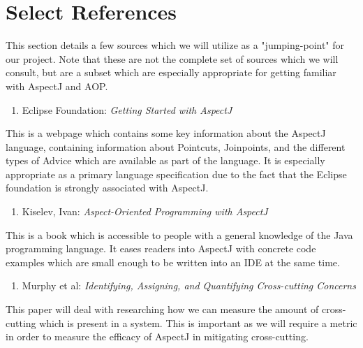 \documentclass[sigconf]{acmart}
\begin{document}
\section{Select References}

This section details a few sources which we will utilize as a "jumping-point" for our project. Note that these are not the complete set of sources which we will consult, but are a subset which are especially appropriate for getting familiar with AspectJ and AOP.

\begin{enumerate}
    \item Eclipse Foundation: \textit{Getting Started with AspectJ}
\end{enumerate}
This is a webpage which contains some key information about the AspectJ language, containing information about Pointcuts, Joinpoints, and the different types of Advice which are available as part of the language. It is especially appropriate as a primary language specification due to the fact that the Eclipse foundation is strongly associated with AspectJ.

\begin{enumerate}
    \item Kiselev, Ivan: \textit{Aspect-Oriented Programming with AspectJ}
\end{enumerate}
This is a book which is accessible to people with a general knowledge of the Java programming language. It eases readers into AspectJ with concrete code examples which are small enough to be written into an IDE at the same time.

\begin{enumerate}
    \item Murphy et al: \textit{Identifying, Assigning, and Quantifying Cross-cutting Concerns}
\end{enumerate}
This paper will deal with researching how we can measure the amount of cross-cutting which is present in a system. This is important as we will require a metric in order to measure the efficacy of AspectJ in mitigating cross-cutting.
\end{document}
